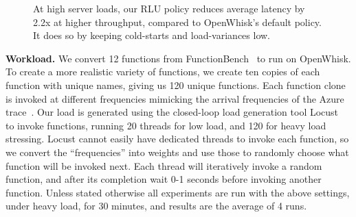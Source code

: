 \begin{figure}%
  \centering
  \hfill
  \hfill
  \caption{At high server loads, our RLU policy reduces average latency by 2.2x at higher throughput, compared to OpenWhisk's default policy. It does so by keeping cold-starts and load-variances low.}
  \label{fig:high-load}
\end{figure}


\noindent \textbf{Workload.}
We convert 12 functions from FunctionBench~\cite{kim_functionbench_2019} to run on OpenWhisk.
To create a more realistic variety of functions, we create ten copies of each function with unique names, giving us 120 unique functions. 
Each function clone is invoked at different frequencies mimicking the arrival frequencies of the Azure trace~\cite{shahrad_serverless_2020}. 
Our load is generated using the closed-loop load generation tool Locust~\cite{locust} to invoke functions, running 20 threads for low load, and 120 for heavy load stressing.
Locust cannot easily have dedicated threads to invoke each function, so we convert the ``frequencies'' into weights and use those to randomly choose what function will be invoked next.
Each thread will iteratively invoke a random function, and after its completion wait 0-1 seconds before invoking another function.
Unless stated otherwise all experiments are run with the above settings, under heavy load, for 30 minutes, and results are the average of 4 runs.

